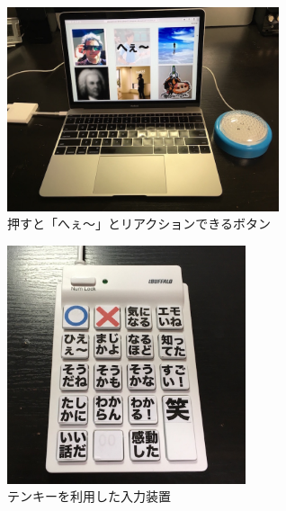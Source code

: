 \begin{figure}[h]
\centering
\includegraphics[width=8cm]{images/heebutton.png}
\caption{押すと「へぇ〜」とリアクションできるボタン}
\label{heebutton}
\end{figure}

\begin{figure}[h]
\centering
\includegraphics[width=7cm]{images/10key.png}
\caption{テンキーを利用した入力装置}
\label{10key}
\end{figure}